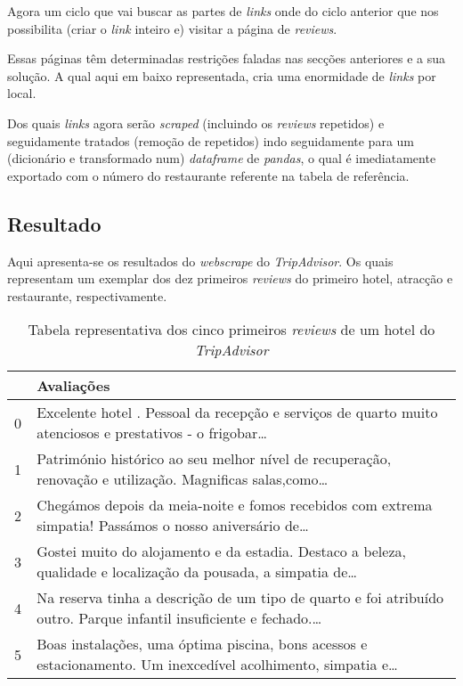 Agora um ciclo que vai buscar as partes de \textit{links} onde do ciclo anterior que nos possibilita (criar o \textit{link} inteiro e) visitar a página de \textit{reviews}.

Essas páginas têm determinadas restrições faladas nas secções anteriores e a sua solução. A qual aqui em baixo representada, cria uma enormidade de \textit{links} por local.

Dos quais \textit{links} agora serão \textit{scraped} (incluindo os \textit{reviews} repetidos) e seguidamente tratados (remoção de repetidos) indo seguidamente para um (dicionário e transformado num) \textit{dataframe} de \textit{pandas}, o qual é imediatamente exportado com o número do restaurante referente na tabela de referência.


\subsection{Resultado}
Aqui apresenta-se os resultados do \textit{webscrape} do \textit{TripAdvisor}. Os quais representam um exemplar dos dez primeiros \textit{reviews} do primeiro hotel, atracção e restaurante, respectivamente.

\begin{table}[!ht]
  \centering
  \begin{adjustbox}{width=\columnwidth,center}
    \begin{tabular}{|l|l|}
      \hline
      ~      & Avaliações                                                                                                               \\ \hline
      0      & Excelente hotel .  Pessoal da recepção e serviços de quarto muito atenciosos e prestativos -  o frigobar\ldots           \\ \hline
      1      & Património histórico ao seu melhor nível de recuperação, renovação e utilização. Magnificas salas,como\ldots             \\ \hline
      2      & Chegámos depois da meia-noite e fomos recebidos com extrema simpatia! Passámos o nosso aniversário de\ldots              \\ \hline
      3      & Gostei muito do alojamento e da estadia. Destaco a beleza, qualidade e localização da  pousada, a simpatia de\ldots      \\ \hline
      4      & Na reserva tinha a descrição de um tipo de quarto e foi atribuído outro. Parque infantil insuficiente e fechado.\ldots   \\ \hline
      5      & Boas instalações, uma óptima piscina, bons acessos e estacionamento.  Um inexcedível acolhimento, simpatia e\ldots       \\ \hline
    \end{tabular}
  \end{adjustbox}
  \caption{Tabela representativa dos cinco primeiros \textit{reviews} de um hotel do \textit{TripAdvisor}}
  \label{table:5}
\end{table}

